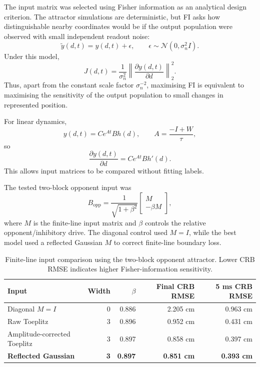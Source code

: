 The input matrix was selected using Fisher information as an analytical design criterion. The attractor simulations are deterministic, but FI asks how distinguishable nearby coordinates would be if the output population were observed with small independent readout noise:
\begin{equation}
    \tilde{y}(d,t)
    =
    y(d,t)+\epsilon,
    \qquad
    \epsilon \sim \mathcal{N}(0,\sigma_n^2 I).
\end{equation}
Under this model,
\begin{equation}
    J(d,t)
    =
    \frac{1}{\sigma_n^2}
    \left\|
        \frac{\partial y(d,t)}{\partial d}
    \right\|_2^2 .
\end{equation}
Thus, apart from the constant scale factor $\sigma_n^{-2}$, maximising FI is equivalent to maximising the sensitivity of the output population to small changes in represented position.

For linear dynamics,
\begin{equation}
    y(d,t)
    =
    C e^{At} B h(d),
    \qquad
    A=\frac{-I+W}{\tau},
\end{equation}
so
\begin{equation}
    \frac{\partial y(d,t)}{\partial d}
    =
    C e^{At} B h'(d).
\end{equation}
This allows input matrices to be compared without fitting labels.

The tested two-block opponent input was
\begin{equation}
    B_{\mathrm{opp}}
    =
    \frac{1}{\sqrt{1+\beta^2}}
    \begin{bmatrix}
        M\\
        -\beta M
    \end{bmatrix},
\end{equation}
where $M$ is the finite-line input matrix and $\beta$ controls the relative opponent/inhibitory drive. The diagonal control used $M=I$, while the best model used a reflected Gaussian $M$ to correct finite-line boundary loss.

\begin{table}[htbp]
    \centering
    \caption{Finite-line input comparison using the two-block opponent attractor. Lower CRB RMSE indicates higher Fisher-information sensitivity.}
    \label{tab:cann_fi_input_comparison}
    \begin{tabular}{lrrrr}
        \toprule
        \textbf{Input} & \textbf{Width} & \textbf{$\beta$} & \textbf{Final CRB RMSE} & \textbf{5 ms CRB RMSE} \\
        \midrule
        Diagonal $M=I$ & 0 & 0.886 & 2.205 cm & 0.963 cm \\
        Raw Toeplitz & 3 & 0.896 & 0.952 cm & 0.431 cm \\
        Amplitude-corrected Toeplitz & 3 & 0.897 & 0.858 cm & 0.397 cm \\
        \textbf{Reflected Gaussian} & \textbf{3} & \textbf{0.897} & \textbf{0.851 cm} & \textbf{0.393 cm} \\
        \bottomrule
    \end{tabular}
\end{table}

